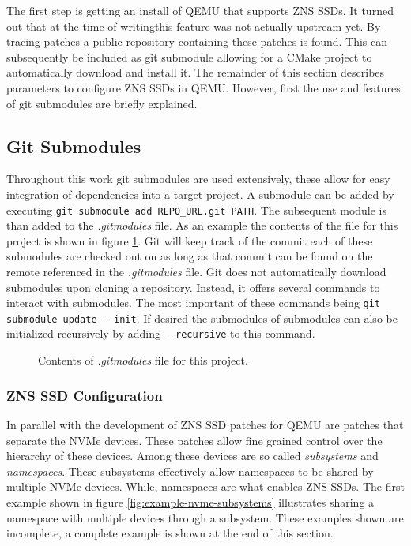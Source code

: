 \documentclass[conference]{IEEEtran}
\newcommand\bashstyle{
	\lstset{
		language=Bash,
		basicstyle=\ttm,
		showstringspaces=false,
		tabsize=2,
		aboveskip=0.2cm,
		belowskip=0.2cm,
		prebreak=\textbackslash,
		extendedchars=true,
		mathescape=false,
		linewidth=8.85cm,
		breaklines=true
	}
}
\newcommand\bashinline[1]{{\bashstyle\lstinline!#1!}}
\newcommand\bashexternal[2][]{{\bashstyle}}
\begin{document}
The first step is getting an install of QEMU that supports ZNS SSDs. It turned
out that at the time of writing\footnotemark[1] this feature was not actually
upstream yet. By tracing patches a public repository containing these patches
is found. This can subsequently be included as git submodule allowing for a
CMake project to automatically download and install it. The remainder of this
section describes parameters to configure ZNS SSDs in QEMU. However, first the
use and features of git submodules are briefly explained.


\subsection{Git Submodules}

Throughout this work git submodules are used extensively, these allow for easy
integration of dependencies into a target project. A submodule can be added by
executing\bashinline{git submodule add REPO_URL.git PATH}. The subsequent
module is than added to the \textit{.gitmodules} file. As an example the
contents of the file for this project is shown in
figure \ref{fig:example-gitmodules}. Git will keep track of the commit each of
these  submodules are checked out on as long as that commit can be found on the
remote referenced in the \textit{.gitmodules} file. Git does not automatically
download  submodules upon cloning a repository. Instead, it offers several
commands to  interact with submodules. The most important of these commands
being\bashinline{git submodule update --init}. If desired the submodules of
submodules can also be initialized recursively by adding\bashinline{--recursive}
to this command.

\begin{center}
	\begin{figure}[H]
		\bashexternal{resources/bash/gitmodules.sh}
		\captionsetup{justification=centering}
		\caption{Contents of \textit{.gitmodules} file for this project.}
		\label{fig:example-gitmodules}
	\end{figure}
\end{center}

\subsubsection{ZNS SSD Configuration}

In parallel with the development of ZNS SSD patches for QEMU are patches that
separate the NVMe devices. These patches allow fine grained control over the
hierarchy of these devices. Among these devices are so called
\textit{subsystems} and \textit{namespaces}. These subsystems effectively allow
namespaces to be shared by multiple NVMe devices. While, namespaces are what
enables ZNS SSDs. The first example shown in
figure \ref{fig:example-nvme-subsystems} illustrates sharing a namespace with
multiple  devices through a subsystem. These examples shown are incomplete, a
complete  example is shown at the end of this section.
\end{document}

